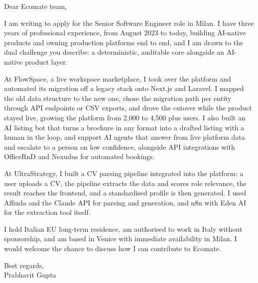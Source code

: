 \documentclass[a4paper,11pt]{article}
\begin{document}
Dear Ecomate team,

I am writing to apply for the Senior Software Engineer role in Milan. I have three years of professional experience, from August 2023 to today, building AI-native products and owning production platforms end to end, and I am drawn to the dual challenge you describe: a deterministic, auditable core alongside an AI-native product layer.

At FlowSpace, a live workspace marketplace, I took over the platform and automated its migration off a legacy stack onto Next.js and Laravel. I mapped the old data structure to the new one, chose the migration path per entity through API endpoints or CSV exports, and drove the cutover while the product stayed live, growing the platform from 2,000 to 4,500 plus users. I also built an AI listing bot that turns a brochure in any format into a drafted listing with a human in the loop, and support AI agents that answer from live platform data and escalate to a person on low confidence, alongside API integrations with OfficeRnD and Nexudus for automated bookings.

At UltraStrategy, I built a CV parsing pipeline integrated into the platform: a user uploads a CV, the pipeline extracts the data and scores role relevance, the result reaches the frontend, and a standardised profile is then generated. I used Affinda and the Claude API for parsing and generation, and n8n with Eden AI for the extraction tool itself.

I hold Italian EU long-term residence, am authorised to work in Italy without sponsorship, and am based in Venice with immediate availability in Milan. I would welcome the chance to discuss how I can contribute to Ecomate.

Best regards,\\
Prabhavit Gupta
\end{document}
